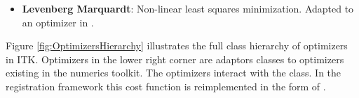 \begin{itemize}

\item \textbf{Levenberg Marquardt}: Non-linear least squares minimization.
Adapted to an optimizer in .

\end{itemize}


Figure \ref{fig:OptimizersHierarchy} illustrates the full class hierarchy of
optimizers in ITK. Optimizers in the lower right corner are adaptors classes to
optimizers existing in the  numerics toolkit. The optimizers
interact with the  class. In the registration framework
this cost function is reimplemented in the form of .





